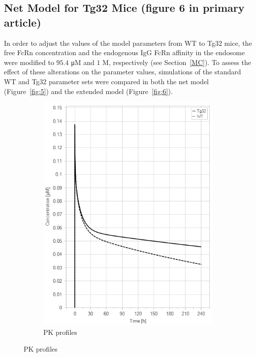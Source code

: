 \documentclass[fleqn,10pt]{physiome}
\begin{document}
\subsection{Net Model for Tg32 Mice (figure 6 in primary article)}\label{Figure6}

In order to adjust the values of the model parameters from WT to Tg32 mice, the free FcRn concentration and the endogenous IgG FcRn affinity in the endosome were modified to $95.4$ \si{\micro M} and $1$ M, respectively (see Section~\ref{MC}). To assess the effect of these alterations on the parameter values, simulations of the standard WT and Tg32 parameter sets were compared in both the net model (Figure~\ref{fig:5}) and the extended model (Figure~\ref{fig:6}).

\begin{figure}[htb]\centering
    \begin{subfigure}{0.49\textwidth}
        \includegraphics[width=\textwidth]{pl7.png}
        \caption{PK profiles}
        \label{fig:5a}

\end{subfigure}
\end{figure}
\end{document}
